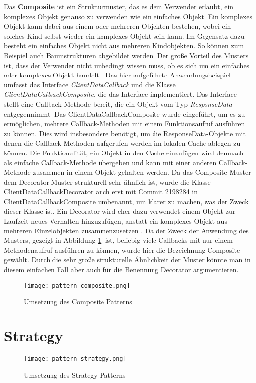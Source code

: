Das \textbf{Composite} ist ein Strukturmuster, das es dem Verwender erlaubt, ein komplexes Objekt genauso zu verwenden wie ein einfaches Objekt.
Ein komplexes Objekt kann dabei aus einem oder mehreren Objekten bestehen, wobei ein solches Kind selbst wieder ein komplexes Objekt sein kann.
Im Gegensatz dazu besteht ein einfaches Objekt nicht aus mehreren Kindobjekten.
So können zum Beispiel auch Baumstrukturen abgebildet werden.
Der große Vorteil des Musters ist, dass der Verwender nicht unbedingt wissen muss, ob es sich um ein einfaches oder komplexes Objekt handelt
\cite[pp.~142--155]{geirhos2015entwurfsmuster}.
\newline
Das hier aufgeführte Anwendungsbeispiel umfasst das Interface \textit{ClientDataCallback} und die Klasse \textit{ClientDataCallbackComposite}, die das Interface implementiert.
Das Interface stellt eine Callback-Methode bereit, die ein Objekt vom Typ \textit{ResponseData} entgegennimmt.
Das ClientDataCallbackComposite wurde eingeführt, um es zu ermöglichen, mehrere Callback-Methoden mit einem Funktionsaufruf ausführen zu können.
Dies wird insbesondere benötigt, um die ResponseData-Objekte mit denen die Callback-Methoden aufgerufen werden im lokalen Cache ablegen zu können.
Die Funktionalität, ein Objekt in den Cache einzufügen wird demnach als einfache Callback-Methode übergeben und kann mit einer anderen Callback-Methode zusammen in einem Objekt gehalten werden.
\newline
Da das Composite-Muster dem Decorator-Muster strukturell sehr ähnlich ist, wurde die Klasse ClientDataCallbackDecorator auch erst mit Commit \href{https://github.com/lukaspanni/OpenSourceStats/commit/2198284a8f90a76a0e0a2e99f9be87855595458e}{2198284} in ClientDataCallbackComposite umbenannt, um klarer zu machen, was der Zweck dieser Klasse ist.
Ein Decorator wird eher dazu verwendet einem Objekt zur Laufzeit neues Verhalten hinzuzufügen, anstatt ein komplexes Objekt aus mehreren Einzelobjekten zusammenzusetzen \cite[pp.~155-169]{geirhos2015entwurfsmuster}.
Da der Zweck der Anwendung des Musters, gezeigt in Abbildung \ref{fig:pattern_composite}, ist, beliebig viele Callbacks mit nur einem Methodenaufruf ausführen zu können, wurde hier die Bezeichnung Composite gewählt.
Durch die sehr große strukturelle Ähnlichkeit der Muster könnte man in diesem einfachen Fall aber auch für die Benennung Decorator argumentieren.

\begin{figure}[h]
    \texttt{[image: pattern\_composite.png]}
    \centering
    \caption{Umsetzung des Composite Patterns}
    \label{fig:pattern_composite}
\end{figure}

\newpage
\section{Strategy}

\begin{figure}[h]
    \texttt{[image: pattern\_strategy.png]}
    \centering
    \caption{Umsetzung des Strategy-Patterns}
    \label{fig:pattern_strategy}
\end{figure}

